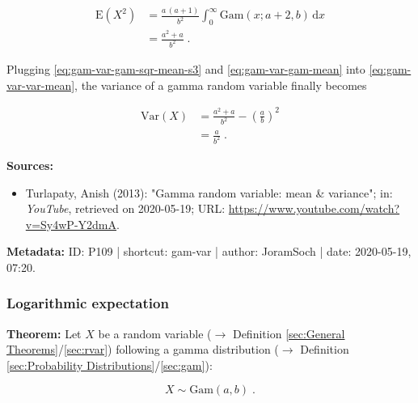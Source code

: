 \documentclass[a4paper,12pt,twoside]{book}
\begin{document}
\begin{equation} \label{eq:gam-var-gam-sqr-mean-s3}
\begin{split}
\mathrm{E}(X^2) &= \frac{a \, (a+1)}{b^2} \int_{0}^{\infty} \mathrm{Gam}(x; a+2, b) \, \mathrm{d}x \\
&= \frac{a^2+a}{b^2} \; .
\end{split}
\end{equation}

Plugging \eqref{eq:gam-var-gam-sqr-mean-s3} and \eqref{eq:gam-var-gam-mean} into \eqref{eq:gam-var-var-mean}, the variance of a gamma random variable finally becomes

\begin{equation} \label{eq:gam-var-gam-var-qed}
\begin{split}
\mathrm{Var}(X) &= \frac{a^2+a}{b^2} - \left( \frac{a}{b} \right)^2 \\
&= \frac{a}{b^2} \; .
\end{split}
\end{equation}


\vspace{1em}
\textbf{Sources:}
\begin{itemize}
\item Turlapaty, Anish (2013): "Gamma random variable: mean \& variance"; in: \textit{YouTube}, retrieved on 2020-05-19; URL: \url{https://www.youtube.com/watch?v=Sy4wP-Y2dmA}.
\end{itemize}


\vspace{1em}
\textbf{Metadata:} ID: P109 | shortcut: gam-var | author: JoramSoch | date: 2020-05-19, 07:20.
\vspace{1em}



\subsubsection[\textbf{Logarithmic expectation}]{Logarithmic expectation} \label{sec:gam-logmean}
\setcounter{equation}{0}

\textbf{Theorem:} Let $X$ be a random variable ($\rightarrow$ Definition \ref{sec:General Theorems}/\ref{sec:rvar}) following a gamma distribution ($\rightarrow$ Definition \ref{sec:Probability Distributions}/\ref{sec:gam}):

\begin{equation} \label{eq:gam-logmean-gam}
X \sim \mathrm{Gam}(a, b) \; .
\end{equation}
\end{document}
